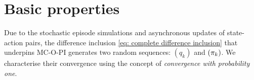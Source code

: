 

    



\section{Basic properties}
\label{sec: mcopi behaviour}


Due to the stochastic episode simulations and asynchronous updates of state-action pairs, the difference inclusion \eqref{eq: complete difference inclusion} that underpins MC-O-PI generates two random sequences: $(q_k)$ and $(\pi_k)$.
We characterise their convergence using the concept of \textit{convergence with probability one}.


